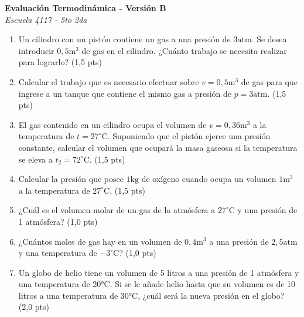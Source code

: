 \documentclass[a4paper,10pt]{article}
\newenvironment{versionexamen}[1]{
  \begin{minipage}[t]{0.48\textwidth}
    \textbf{Evaluación Termodinámica - Versión #1} \\
    \textit{Escuela 4117 - 5to 2da}
    \begin{enumerate}[label=\textbf{\arabic*.}, leftmargin=15pt, topsep=4pt, itemsep=4pt]
      \small
}{
    \end{enumerate}
    \vspace{0.4cm}
  \end{minipage}
}
\begin{document}
\begin{versionexamen}{B}
	\item Un cilindro con un pistón contiene un gas a una presión de $3\text{atm}$. Se desea introducir $0,5\text{m}^3$ de gas en el cilindro. ¿Cuánto trabajo se necesita realizar para lograrlo? (1,5 pts)
	\item Calcular el trabajo que es necesario efectuar sobre $v=0,5\text{m}^3$ de gas para que ingrese a un tanque que contiene el mismo gas a presión de $p=3\text{atm}$. (1,5 pts)
	\item El gas contenido en un cilindro ocupa el volumen de $v=0,36\text{m}^3$ a la temperatura de $t=27^\circ$C. Suponiendo que el pistón ejerce una presión constante, calcular el volumen que ocupará la masa gaseosa si la temperatura se eleva a $t_2=72^\circ$C. (1,5 pts)
	\item Calcular la presión que posee $1\text{kg}$ de oxígeno cuando ocupa un volumen $1\text{m}^3$ a la temperatura de $27^\circ$C. (1,5 pts)
	\item ¿Cuál es el volumen molar de un gas de la atmósfera a $27^\circ$C y una presión de 1 atmósfera? (1,0 pts)
	\item ¿Cuántos moles de gas hay en un volumen de $0,4\text{m}^3$ a una presión de $2,5\text{atm}$ y una temperatura de $-3^\circ$C? (1,0 pts)
	\item Un globo de helio tiene un volumen de 5 litros a una presión de 1 atmósfera y una temperatura de 20°C. Si se le añade helio hasta que su volumen es de 10 litros a una temperatura de 30°C, ¿cuál será la nueva presión en el globo? (2,0 pts)
\end{versionexamen}
\vfill
\end{document}
